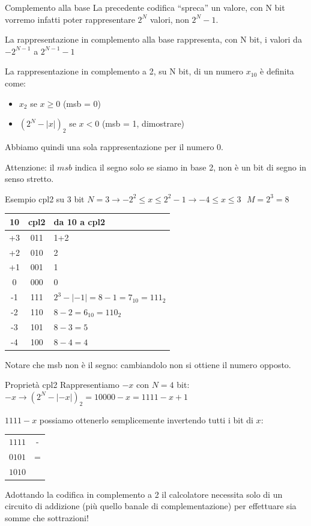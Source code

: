 \documentclass[]{beamer}
\begin{document}
\begin{frame}{Complemento alla base}
La precedente codifica ``spreca'' un valore, con N bit vorremo infatti poter rappresentare $2^N$ valori, non $2^N-1$.

La rappresentazione in complemento alla base rappresenta, con N bit, i valori da $-2^{N-1}$ a $2^{N-1}-1$

\pause

La rappresentazione in complemento a 2, su N bit, di un numero $x_{10}$ è definita come:
\begin{itemize}
	\item $x_2$ se $x \geq 0$ (msb = 0)
	\item $(2^N-|x|)_2$ se $x < 0$ (msb = 1, dimostrare)
\end{itemize}

\pause

Abbiamo quindi una sola rappresentazione per il numero 0.

Attenzione: il $msb$ indica il segno solo se siamo in base 2, non è un bit di segno in senso stretto.
\end{frame}

\begin{frame}{Esempio cpl2 su 3 bit}
$N=3 \rightarrow -2^2 \leq x \leq 2^2-1 \rightarrow -4 \leq x \leq 3 \ \ \ M=2^3=8$
\pause

\centering
\begin{tabular}{c|c|l}
	10	&	cpl2	&	da 10 a cpl2 \\
	\hline
	+3&	011	&	1+2\\
	+2& 010	&	2\\
	+1& 001	&	1\\
	0 & 000	&	0\\
	-1& 111	&	$2^3-|-1| = 8-1 = 7_{10} = 111_2$\\
	-2& 110	&	$8-2 = 6_{10} = 110_2$\\
	-3& 101	&	$8-3 = 5$\\
	-4& 100	&	$8-4 = 4$\\
\end{tabular}

Notare che msb \alert{non è} il segno: cambiandolo non si ottiene il numero opposto.
\end{frame}

\begin{frame}{Proprietà cpl2}
Rappresentiamo $-x$ con $N=4$ bit:\\ $-x \rightarrow (2^N-|-x|)_2 = 10000 -x = 1111-x+1$

\pause
$1111-x$ possiamo ottenerlo semplicemente invertendo tutti i bit di $x$:
\begin{tabular}{c|c}
	$1111$ & - \\
	$0101$ & = \\
	\hline
	$1010$& \\
\end{tabular}

\pause
Adottando la codifica in complemento a 2 il calcolatore necessita solo di un circuito di addizione (più quello banale di complementazione) per effettuare sia somme che sottrazioni!
\end{frame}
\end{document}
